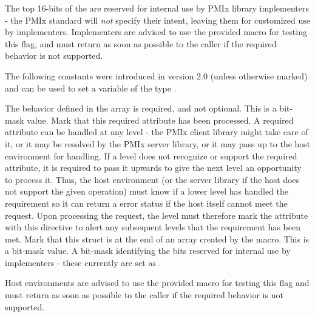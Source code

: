 \adviceimplstart
The top 16-bits of the  are reserved for internal use by \ac{PMIx} library implementers - the \ac{PMIx} standard will \textit{not} specify their intent, leaving them for customized use by implementers. Implementers are advised to use the provided  macro for testing this flag, and must return  as soon as possible to the caller if the required behavior is not supported.
\adviceimplend

The following constants were introduced in version 2.0 (unless otherwise marked) and can be used to set a variable of the type .

\begin{constantdesc}
%
The behavior defined in the  array is required, and not optional. This is a bit-mask value.
%
Mark that this required attribute has been processed. A required attribute can be handled at any level - the \ac{PMIx} client library might take care of it, or it may be resolved by the \ac{PMIx} server library, or it may pass up to the host environment for handling. If a level does not recognize or support the required attribute, it is required to pass it upwards to give the next level an opportunity to process it. Thus, the host environment (or the server library if the host does not support the given operation) must know if a lower level has handled the requirement so it can return a  error status if the host itself cannot meet the request. Upon processing the request, the level must therefore mark the attribute with this directive to alert any subsequent levels that the requirement has been met.
%
Mark that this  struct is at the end of an array created by the  macro. This is a bit-mask value.
%
A bit-mask identifying the bits reserved for internal use by implementers - these currently are set as .
%
\end{constantdesc}

\advicermstart
Host environments are advised to use the provided  macro for testing this flag and must return  as soon as possible to the caller if the required behavior is not supported.
\advicermend


